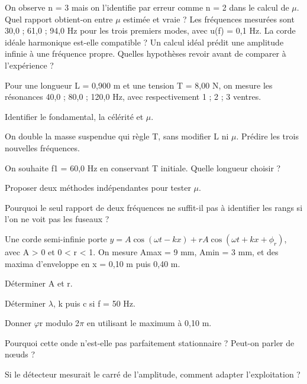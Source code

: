 On observe n = 3 mais on l’identifie par erreur comme n = 2 dans le calcul de \ensuremath{\mu}. Quel rapport obtient-on entre \ensuremath{\mu} estimée et vraie ?
Les fréquences mesurées sont 30,0 ; 61,0 ; 94,0 Hz pour les trois premiers modes, avec u(f) = 0,1 Hz. La corde idéale harmonique est-elle compatible ?
Un calcul idéal prédit une amplitude infinie à une fréquence propre. Quelles hypothèses revoir avant de comparer à l’expérience ?


\label{ex-D1}
Pour une longueur L = 0,900 m et une tension T = 8,00 N, on mesure les résonances 40,0 ; 80,0 ; 120,0 Hz, avec respectivement 1 ; 2 ; 3 ventres.\begin{questions}
\item Identifier le fondamental, la célérité et \ensuremath{\mu}.
\item On double la masse suspendue qui règle T, sans modifier L ni \ensuremath{\mu}. Prédire les trois nouvelles fréquences.
\item On souhaite f1 = 60,0 Hz en conservant T initiale. Quelle longueur choisir ?
\item Proposer deux méthodes indépendantes pour tester \ensuremath{\mu}.
\item Pourquoi le seul rapport de deux fréquences ne suffit-il pas à identifier les rangs si l’on ne voit pas les fuseaux ?
\end{questions}


\label{ex-D2}
Une corde semi-infinie porte $y=A\cos(\omega t-kx)+rA\cos(\omega t+kx+\phi_r)$, avec A > 0 et 0 < r < 1. On mesure Amax = 9 mm, Amin = 3 mm, et des maxima d’enveloppe en x = 0,10 m puis 0,40 m.\begin{questions}
\item Déterminer A et r.
\item Déterminer \ensuremath{\lambda}, k puis c si f = 50 Hz.
\item Donner \ensuremath{\varphi}r modulo 2\ensuremath{\pi} en utilisant le maximum à 0,10 m.
\item Pourquoi cette onde n’est-elle pas parfaitement stationnaire ? Peut-on parler de nœuds ?
\item Si le détecteur mesurait le carré de l’amplitude, comment adapter l’exploitation ?
\end{questions}


